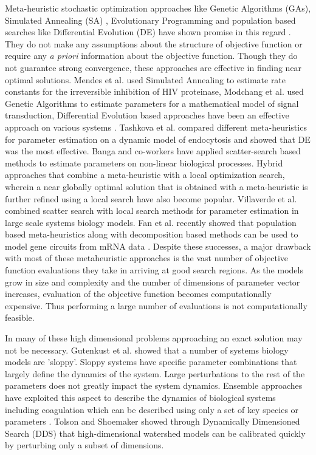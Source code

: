 \documentclass[12pt]{article}
\begin{document}
Meta-heuristic stochastic optimization approaches like Genetic Algorithms (GAs), Simulated Annealing (SA) \cite{kirkpatrick1983optimization}, Evolutionary Programming and population based searches like Differential Evolution (DE) \cite{storn1997differential} have shown promise in this regard \cite{sun2012parameter}. They do not make any assumptions about the structure of objective function or require any \textit{a priori} information about the objective function. Though they do not guarantee strong convergence, these approaches are effective in finding near optimal solutions.  Mendes et al. \cite{mendes1998non} used Simulated Annealing to estimate rate constants for the irreversible inhibition of HIV proteinase, Modchang et al. \cite {modchang2008mathematical} used Genetic Algorithms to estimate parameters for a mathematical model of signal transduction, Differential Evolution based approaches have been an effective approach on various systems \cite{tsai2005evolutionary,wang2001hybrid,noman2007inferring}. Tashkova et al. \cite{tashkova2011parameter} compared different meta-heuristics for parameter estimation on a dynamic model of endocytosis and showed that DE was the most effective. Banga and co-workers have applied scatter-search based methods \cite{villaverde2012cooperative,rodriguez2006novel,egea2007scatter} to estimate parameters on non-linear biological processes. Hybrid approaches that combine a meta-heuristic with a local optimization search, wherein a near globally optimal solution that is obtained with a meta-heuristic is further refined using a local search have also become popular. Villaverde et al. \cite{villaverde2015biopredyn} combined scatter search with local search methods for parameter estimation in large scale systems biology models. Fan et al. recently showed that population based meta-heuristics along with decomposition based methods can be used to model gene circuits from mRNA data \cite{fan2015parameter}. Despite these successes, a  major drawback with most of these metaheuristic approaches is the vast number of objective function evaluations they take in arriving at good search regions. As the models grow in size and complexity and the number of dimensions of parameter vector increases, evaluation of the objective function becomes computationally expensive. Thus performing a large number of evaluations is not computationally feasible. 

In many of these high dimensional problems approaching an exact solution may not be necessary. Gutenkust et al. \cite{gutenkunst2007universally} showed that a number of systems biology models are 'sloppy'. Sloppy systems have specific parameter combinations that largely define the dynamics of the system. Large perturbations to the rest of the parameters does not greatly impact the system dynamics. Ensemble approaches \cite{song2010ensembles,luan2010ensembles} have exploited this aspect to describe the dynamics of biological systems including coagulation which can be described using only a set of key species or parameters \cite{sagar2015dynamic}. Tolson and Shoemaker \cite{tolson2007dynamically} showed through Dynamically Dimensioned Search (DDS) that high-dimensional watershed models can be calibrated quickly by perturbing only a subset of dimensions.
\end{document}
